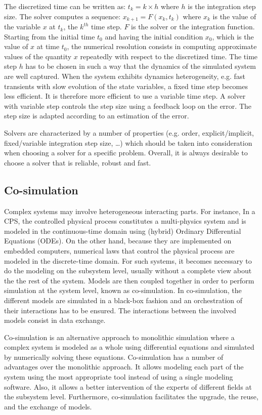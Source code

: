 The discretized time can be written as: $t_k = k \times h$ where $h$ is the integration step size. The solver computes a sequence: $x_{k+1} = F(x_k,t_k)$ where $x_k$ is the value of the variable $x$ at $t_k$, the $k^{th}$ time step. $F$ is the solver or the integration function. Starting from the initial time $t_0$ and having the initial condition $x_0$, which is the value of $x$ at time $t_0$, the numerical resolution consists in computing approximate values of the quantity $x$ repeatedly with respect to the discretized time. The time step $h$ has to be chosen in such a way that the dynamics of the simulated system are well captured. When the system exhibits dynamics heterogeneity, e.g. fast transients with slow evolution of the state variables, a fixed time step becomes less efficient. It is therefore  more efficient to use a variable time step. A solver with variable step controls the step size using a feedback loop on the error. The step size is adapted according to an estimation of the error. 

Solvers are characterized by a number of properties (e.g. order, explicit/implicit, fixed/variable integration step size, \ldots) which should be taken into consideration when choosing a solver for a specific problem. Overall, it is always desirable to choose a solver that is reliable, robust and fast.


\subsection{Co-simulation}

Complex systems may involve heterogeneous interacting parts. For instance, In a CPS, the controlled physical process constitutes a multi-physics system and is modeled in the continuous-time domain using (hybrid) Ordinary Differential Equations (ODEs). On the other hand, because they are implemented on embedded computers, numerical laws that control the physical process are modeled in the discrete-time domain. For such systems, it becomes necessary to do the modeling on the subsystem level, usually without a complete view about the the rest of the system. Models are then coupled together in order to perform simulation at the system level, known as co-simulation. In co-simulation, the different models are simulated in a black-box fashion and an orchestration of their interactions has to be ensured. The interactions between the involved models consist in data exchange.

Co-simulation is an alternative approach to monolithic simulation where a complex system is modeled as a whole using differential equations and simulated by numerically solving these equations. Co-simulation has a number of advantages over the monolithic approach. It allows modeling each part of the system using the most appropriate tool instead of using a single modeling software. Also, it allows a better intervention of the experts of different fields at the subsystem level. Furthermore, co-simulation facilitates the upgrade, the reuse, and the exchange of models. 

